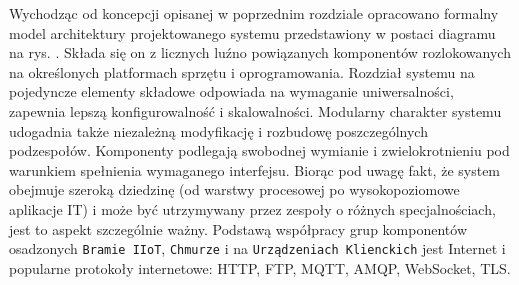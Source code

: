 \documentclass[a4paper, 12pt, twoside]{article}
\begin{document}
Wychodząc od koncepcji opisanej w poprzednim rozdziale opracowano
formalny model architektury projektowanego systemu przedstawiony
w postaci diagramu na rys. . Składa się on z licznych luźno
powiązanych komponentów rozlokowanych na określonych platformach sprzętu i oprogramowania.
Rozdział systemu na pojedyncze elementy składowe odpowiada na wymaganie uniwersalności, zapewnia
lepszą konfigurowalność i skalowalności. Modularny charakter systemu
udogadnia także niezależną modyfikację i rozbudowę poszczególnych podzespołów.
Komponenty podlegają swobodnej wymianie
i zwielokrotnieniu pod warunkiem spełnienia wymaganego interfejsu.
Biorąc pod uwagę fakt, że system obejmuje szeroką dziedzinę (od warstwy procesowej
po wysokopoziomowe aplikacje IT) i może być utrzymywany przez zespoły o różnych
specjalnościach, jest to aspekt szczególnie ważny. Podstawą współpracy
grup komponentów osadzonych \texttt{Bramie IIoT}, \texttt{Chmurze} i na
\texttt{Urządzeniach Klienckich} jest
Internet i popularne protokoły internetowe: HTTP, FTP, MQTT, AMQP, WebSocket, TLS.
\end{document}
